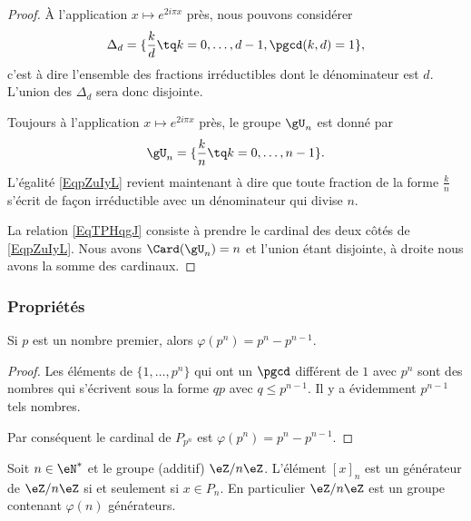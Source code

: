 \begin{proof}
    À l'application \( x\mapsto  e^{2i\pi x}\) près, nous pouvons considérer
    \begin{equation}
        \Delta_d=\{ \frac{ k }{ d }\tq k=0,\ldots, d-1, \pgcd(k,d)=1 \},
    \end{equation}
    c'est à dire l'ensemble des fractions irréductibles dont le dénominateur est \( d\). L'union des \( \Delta_d\) sera donc disjointe.
    
    Toujours à l'application \( x\mapsto  e^{2i\pi x}\) près, le groupe \( \gU_n\) est donné par
    \begin{equation}
        \gU_n=\{ \frac{ k }{ n }\tq k=0,\ldots, n-1 \}.
    \end{equation}
    L'égalité \eqref{EqpZuIyL} revient maintenant à dire que toute fraction de la forme \( \frac{ k }{ n }\) s'écrit de façon irréductible avec un dénominateur qui divise \( n\).

    La relation \eqref{EqTPHqgJ} consiste à prendre le cardinal des deux côtés de \eqref{EqpZuIyL}. Nous avons \( \Card(\gU_n)=n\) et l'union étant disjointe, à droite nous avons la somme des cardinaux.
\end{proof}

\subsubsection{Propriétés}



\begin{lemma}
    Si \( p\) est un nombre premier, alors \( \varphi(p^n)=p^n-p^{n-1}\).
\end{lemma}

\begin{proof}
    Les éléments de \( \{ 1,\ldots,p^n \}\) qui ont un \( \pgcd\) différent de \( 1\) avec \( p^n\) sont des nombres qui s'écrivent sous la forme \( qp\) avec \( q\leq p^{n-1}\). Il y a évidemment \( p^{n-1}\) tels nombres.

    Par conséquent le cardinal de \( P_{p^n}\) est \( \varphi(p^{n})=p^n-p^{n-1}\).
\end{proof}

\begin{proposition}     \label{PropZnmuphiGensn}
    Soit \( n\in\eN^*\) et le groupe (additif) \( \eZ/n\eZ\). L'élément \( [x]_n\) est un générateur de \( \eZ/n\eZ\) si et seulement si \( x\in P_n\). En particulier \( \eZ/n\eZ\) est un groupe contenant \( \varphi(n)\) générateurs.
\end{proposition}

